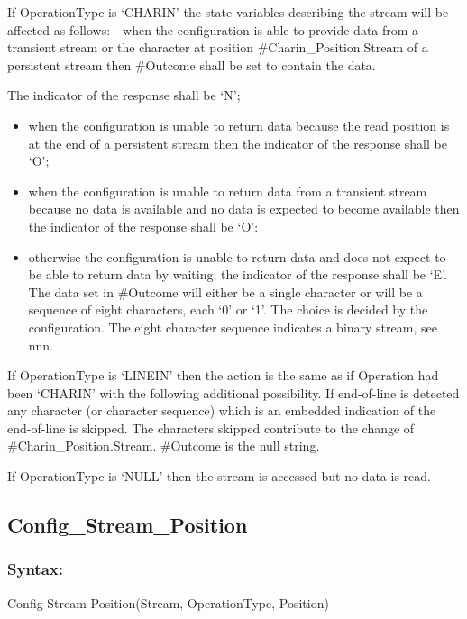 If OperationType is `CHARIN' the state variables describing the stream
will be affected as follows: - when the configuration is able to provide
data from a transient stream or the character at position
\#Charin\_Position.Stream of a persistent stream then \#Outcome shall be
set to contain the data.

The indicator of the response shall be `N';

\begin{itemize}
\tightlist
\item
  when the configuration is unable to return data because the read
  position is at the end of a persistent stream then the indicator of
  the response shall be `O';
\item
  when the configuration is unable to return data from a transient
  stream because no data is available and no data is expected to become
  available then the indicator of the response shall be `O':
\item
  otherwise the configuration is unable to return data and does not
  expect to be able to return data by waiting; the indicator of the
  response shall be `E'. The data set in \#Outcome will either be a
  single character or will be a sequence of eight characters, each `0'
  or `1'. The choice is decided by the configuration. The eight
  character sequence indicates a binary stream, see nnn.
\end{itemize}

If OperationType is `LINEIN' then the action is the same as if Operation
had been `CHARIN' with the following additional possibility. If
end-of-line is detected any character (or character sequence) which is
an embedded indication of the end-of-line is skipped. The characters
skipped contribute to the change of \#Charin\_Position.Stream. \#Outcome
is the null string.

If OperationType is `NULL' then the stream is accessed but no data is
read.

\subsection{Config\_Stream\_Position}\label{config_stream_position}

\subsubsection{Syntax:}\label{syntax-24}

Config Stream Position(Stream, OperationType, Position)

